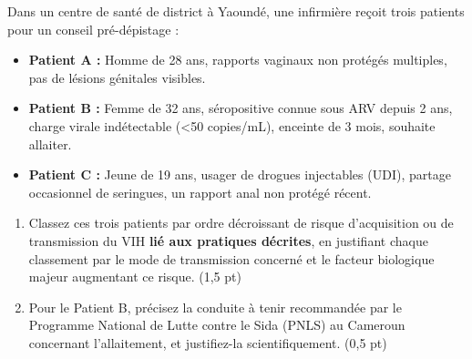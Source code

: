 \documentclass[11pt]{article}
\begin{document}
\begin{exercice}
\label{exo:transmission}
Dans un centre de santé de district à Yaoundé, une infirmière reçoit trois patients pour un conseil pré-dépistage :
\begin{itemize}
    \item \textbf{Patient A :} Homme de 28 ans, rapports vaginaux non protégés multiples, pas de lésions génitales visibles.
    \item \textbf{Patient B :} Femme de 32 ans, séropositive connue sous ARV depuis 2 ans, charge virale indétectable (\textless 50 copies/mL), enceinte de 3 mois, souhaite allaiter.
    \item \textbf{Patient C :} Jeune de 19 ans, usager de drogues injectables (UDI), partage occasionnel de seringues, un rapport anal non protégé récent.
\end{itemize}
\begin{enumerate}
    \item Classez ces trois patients par ordre décroissant de risque d'acquisition ou de transmission du VIH \textbf{lié aux pratiques décrites}, en justifiant chaque classement par le mode de transmission concerné et le facteur biologique majeur augmentant ce risque. \hfill (1,5 pt)
    \item Pour le Patient B, précisez la conduite à tenir recommandée par le Programme National de Lutte contre le Sida (PNLS) au Cameroun concernant l'allaitement, et justifiez-la scientifiquement. \hfill (0,5 pt)
\end{enumerate}
\end{exercice}
\end{document}
